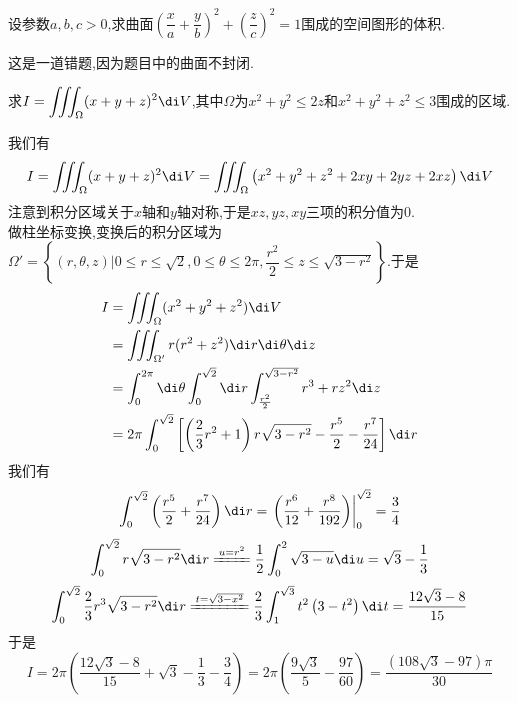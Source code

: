 \documentclass{ctexart}
\begin{document}
\begin{problem}[L.3.5]
    设参数$a,b,c>0$,求曲面$\left(\dfrac xa+\dfrac yb\right)^2+\left(\dfrac zc\right)^2=1$围成的空间图形的体积.
\end{problem}
\begin{solution}
    这是一道错题,因为题目中的曲面不封闭.
\end{solution}
\begin{problem}[L.3.6]
    求$\displaystyle I=\iiint_{\Omega}(x+y+z)^2\di V$,其中$\Omega$为$x^2+y^2\leqslant 2z$和$x^2+y^2+z^2\leqslant3$围成的区域.
\end{problem}
\begin{solution}
    我们有
    \[I=\iiint_{\Omega}(x+y+z)^2\di V=\iiint_{\Omega}\left(x^2+y^2+z^2+2xy+2yz+2xz\right)\di V\]
    注意到积分区域关于$x$轴和$y$轴对称,于是$xz,yz,xy$三项的积分值为$0$.\\
    做柱坐标变换,变换后的积分区域为$\Omega'=\left\{(r,\theta,z)|0\leqslant r\leqslant\sqrt2,0\leqslant\theta\leqslant2\pi,\dfrac{r^2}{2}\leqslant z\leqslant\sqrt{3-r^2}\right\}$.于是
    \[\begin{aligned}
        I
        &= \iiint_{\Omega}(x^2+y^2+z^2)\di V \\
        &= \iiint_{\Omega'}r(r^2+z^2)\di r\di\theta\di z \\
        &= \int_0^{2\pi}\di\theta\int_0^{\sqrt2}\di r\int_{\frac{r^2}{2}}^{\sqrt{3-r^2}}r^3+rz^2\di z \\
        &= 2\pi\int_0^{\sqrt{2}}\left[\left(\dfrac23r^2+1\right)r\sqrt{3-r^2}-\dfrac{r^5}{2}-\dfrac{r^7}{24}\right]\di r \\
    \end{aligned}\]
    我们有
    \[\int_0^{\sqrt{2}}\left(\dfrac{r^5}{2}+\dfrac{r^7}{24}\right)\di r=\left.\left(\dfrac{r^6}{12}+\dfrac{r^8}{192}\right)\right|_0^{\sqrt2}=\dfrac34\]
    \[\int_0^{\sqrt2}r\sqrt{3-r^2}\di r\xlongequal{u=r^2}\dfrac12\int_0^2\sqrt{3-u}\di u=\sqrt3-\dfrac13\]
    \[\int_0^{\sqrt2}\dfrac23r^3\sqrt{3-r^2}\di r\xlongequal{t=\sqrt{3-x^2}}\dfrac23\int_1^{\sqrt3}t^2\left(3-t^2\right)\di t=\dfrac{12\sqrt3-8}{15}\]
    于是
    \[I=2\pi\left(\dfrac{12\sqrt3-8}{15}+\sqrt3-\dfrac13-\dfrac34\right)=2\pi\left(\dfrac{9\sqrt3}{5}-\dfrac{97}{60}\right)=\dfrac{\left(108\sqrt3-97\right)\pi}{30}\]
\end{solution}
\end{document}
